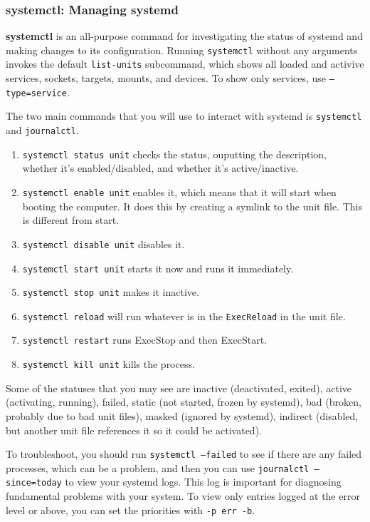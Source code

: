 \subsubsection{systemctl: Managing systemd} 

  \textbf{systemctl} is an all-purpose command for investigating the status of systemd and making changes to its configuration. Running \texttt{systemctl} without any arguments invokes the default \texttt{list-units} subcommand, which shows all loaded and activive services, sockets, targets, mounts, and devices. To show only services, use \texttt{--type=service}. 

  The two main commands that you will use to interact with systemd is \texttt{systemctl} and \texttt{journalctl}. 
  
  \begin{enumerate}
    \item \texttt{systemctl status unit} checks the status, ouputting the description, whether it's enabled/disabled, and whether it's active/inactive. 
    \item \texttt{systemctl enable unit} enables it, which means that it will start when booting the computer. It does this by creating a symlink to the unit file. This is different from start. 
    \item \texttt{systemctl disable unit} disables it. 
    \item \texttt{systemctl start unit} starts it now and runs it immediately. 
    \item \texttt{systemctl stop unit} makes it inactive. 
    \item \texttt{systemctl reload} will run whatever is in the \texttt{ExecReload} in the unit file. 
    \item \texttt{systemctl restart} runs ExecStop and then ExecStart. 
    \item \texttt{systemctl kill unit} kills the process. 
  \end{enumerate}

  Some of the statuses that you may see are inactive (deactivated, exited), active (activating, running), failed, static (not started, frozen by systemd), bad (broken, probably due to bad unit files), masked (ignored by systemd), indirect (disabled, but another unit file references it so it could be activated). 

  To troubleshoot, you should run \texttt{systemctl --failed} to see if there are any failed processes, which can be a problem, and then you can use \texttt{journalctl --since=today} to view your systemd logs. This log is important for diagnosing fundamental problems with your system. To view only entries logged at the error level or above, you can set the priorities with \texttt{-p err -b}. 

